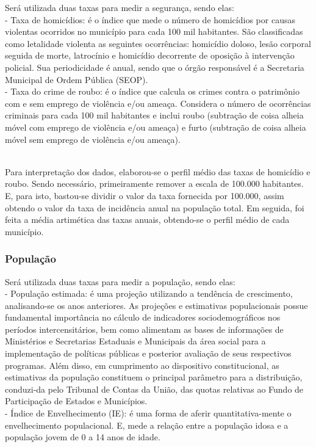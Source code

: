 \documentclass[a4paper, 10pt]{article}
\begin{document}
    Será utilizada duas taxas para medir a segurança, sendo elas:
    \\
    \noindent
    - Taxa de homicídios: é o índice que mede o número de homicídios por causas violentas ocorridos no município para cada 100 mil habitantes. São classificadas como letalidade violenta as seguintes ocorrências: homicídio doloso, lesão corporal seguida de morte, latrocínio e homicídio decorrente de oposição à intervenção policial. Sua periodicidade é anual, sendo que o órgão responsável é a Secretaria Municipal de Ordem Pública (SEOP).
    \\
	- Taxa do crime de roubo: é o índice que calcula os crimes contra o patrimônio com e sem emprego de violência e/ou ameaça. Considera o número de ocorrências criminais para cada 100 mil habitantes e inclui roubo (subtração de coisa alheia móvel com emprego de violência e/ou ameaça) e furto (subtração de coisa alheia móvel sem emprego de violência e/ou ameaça).
	
	\\
	Para interpretação dos dados, elaborou-se o perfil médio das taxas de homicídio e roubo. Sendo necessário, primeiramente remover a escala de 100.000 habitantes. E, para isto, bastou-se dividir o valor da taxa fornecida por 100.000, assim obtendo o valor da taxa de incidência anual na população total. Em seguida, foi feita a média artimética das taxas anuais, obtendo-se o perfil médio de cada município.
	
	 \subsubsection{População}
	  Será utilizada duas taxas para medir a população, sendo elas:
    \\
	  \noindent
	- População estimada: é uma projeção utilizando a tendência de crescimento, analisando-se os anos anteriores. As projeções e estimativas populacionais possue fundamental importância no cálculo de indicadores sociodemográficos nos períodos intercensitários, bem como alimentam as bases de informações de Ministérios e Secretarias Estaduais e Municipais da área social para a implementação de políticas públicas e posterior avaliação de seus respectivos programas. Além disso, em cumprimento ao dispositivo constitucional, as estimativas da população constituem o principal parâmetro para a distribuição, conduzi-da pelo Tribunal de Contas da União, das quotas relativas ao Fundo de Participação de Estados e Municípios.
    \\
    - Índice de Envelhecimento (IE): é uma forma de aferir quantitativa-mente o envelhecimento populacional. E, mede a relação entre a população idosa e a população jovem de 0 a 14 anos de idade. 
    
\end{document}
